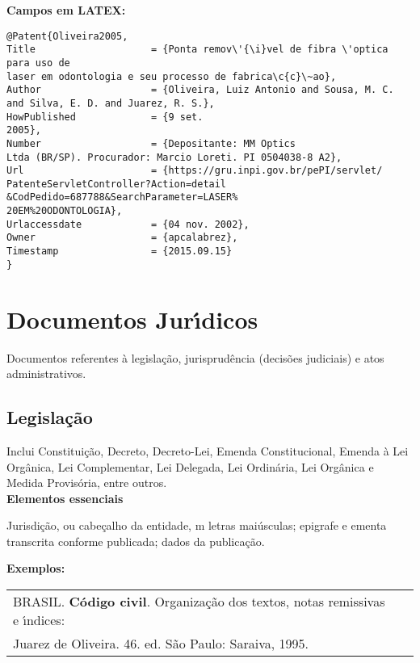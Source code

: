 \textbf{Campos em LATEX:} 

\begin{verbatim}
@Patent{Oliveira2005,
Title                    = {Ponta remov\'{\i}vel de fibra \'optica para uso de
laser em odontologia e seu processo de fabrica\c{c}\~ao},
Author                   = {Oliveira, Luiz Antonio and Sousa, M. C. 
and Silva, E. D. and Juarez, R. S.},
HowPublished             = {9 set.
2005},
Number                   = {Depositante: MM Optics
Ltda (BR/SP). Procurador: Marcio Loreti. PI 0504038-8 A2},
Url                      = {https://gru.inpi.gov.br/pePI/servlet/
PatenteServletController?Action=detail
&CodPedido=687788&SearchParameter=LASER%
20EM%20ODONTOLOGIA},
Urlaccessdate            = {04 nov. 2002},
Owner                    = {apcalabrez},
Timestamp                = {2015.09.15}
}
\end{verbatim}

\section{Documentos Jur\'{\i}dicos}

Documentos referentes \`a legisla\c{c}\~ao, jurisprud\^encia (decis\~oes judiciais) e
atos administrativos.

\subsection{Legisla\c{c}\~ao}

 Inclui Constitui\c{c}\~ao, Decreto, Decreto-Lei, Emenda Constitucional, Emenda \`a Lei Org\^anica, Lei Complementar, Lei Delegada, Lei Ordin\'aria, Lei Org\^anica e Medida Provis\'oria, entre outros.\\

\textbf{Elementos essenciais}

Jurisdi\c{c}\~ao, ou cabe\c{c}alho da entidade, m letras mai\'usculas; epigrafe e ementa transcrita conforme publicada; dados da publica\c{c}\~ao.

 
\textbf{Exemplos:} \\

\begin{tabular}{|l|c|} \hline
	BRASIL. \textbf{C\'odigo civil}. Organiza\c{c}\~ao dos textos, notas remissivas e \'{\i}ndices: \\Juarez de Oliveira. 46. ed. S\~ao Paulo: Saraiva, 1995. 
	\\\hline
\end{tabular} \\

